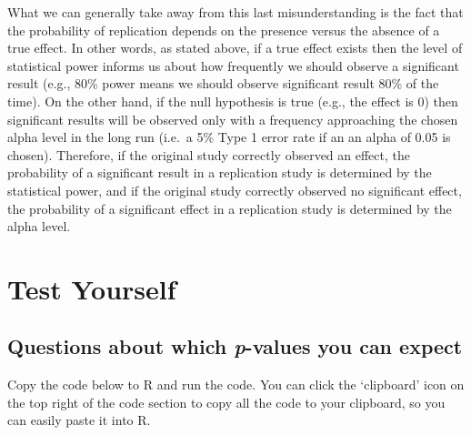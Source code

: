 \documentclass[
  oneside]{krantz}
\begin{document}
What we can generally take away from this last misunderstanding is the fact that the probability of replication depends on the presence versus the absence of a true effect. In other words, as stated above, if a true effect exists then the level of statistical power informs us about how frequently we should observe a significant result (e.g., 80\% power means we should observe significant result 80\% of the time). On the other hand, if the null hypothesis is true (e.g., the effect is 0) then significant results will be observed only with a frequency approaching the chosen alpha level in the long run (i.e.~a 5\% Type 1 error rate if an an alpha of 0.05 is chosen). Therefore, if the original study correctly observed an effect, the probability of a significant result in a replication study is determined by the statistical power, and if the original study correctly observed no significant effect, the probability of a significant effect in a replication study is determined by the alpha level.

\hypertarget{test-yourself}{%
\section{Test Yourself}\label{test-yourself}}

\hypertarget{questions-about-which-p-values-you-can-expect}{%
\subsection{\texorpdfstring{Questions about which \emph{p}-values you can expect}{Questions about which p-values you can expect}}\label{questions-about-which-p-values-you-can-expect}}

Copy the code below to R and run the code. You can click the `clipboard' icon on the top right of the code section to copy all the code to your clipboard, so you can easily paste it into R.
\end{document}
